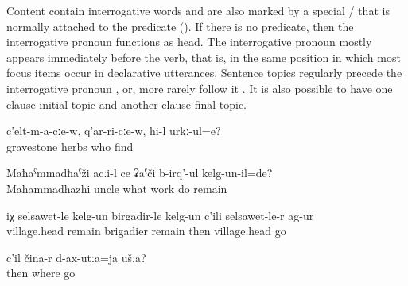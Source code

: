 Content  contain interrogative words and are also marked by a special  \slash{} that is normally attached to the predicate (). If there is no predicate, then the interrogative pronoun functions as head. The interrogative pronoun mostly appears immediately before the verb, that is, in the same position in which most focus items occur in declarative utterances. Sentence topics regularly precede the interrogative pronoun ,  or, more rarely follow it . It is also possible to have one clause-initial topic and another clause-final topic.
%
\begin{exe}
	\ex	\label{ex:Among the graves, in the grass, who finds (him)}
	\gll	c'elt-m-a-cːe-w,	q'ar-ri-cːe-w,	hi-l	urkː-ul=e?\\
		gravestone	herbs	who	find\\
	\glt	{}

	\ex	\label{ex:Which work was uncle Mahammadhazhi doing He was the village head, brigadier, then he stopped being village head}
	\begin{xlist}
		\ex	\label{ex:Which work was uncle Mahammadhazhi doing Q}
		\gll	Maħaˁmmadħaˁži	acːi-l		ce	ʡaˁči	b-irq'-ul		kelg-un-il=de?\\
			Mahammadhazhi	uncle	what	work	do	remain\\
		\glt	{}

		\ex	\label{ex:He was the village head, brigadier, then he stopped being village head A}
		\gll	iχ	selsawet-le	kelg-un	birgadir-le	kelg-un c'ili	selsawet-le-r	ag-ur\\
				village.head	remain	brigadier	remain	then	village.head	go\\
		\glt	{}
	\end{xlist}

	\ex	\label{ex:Then from where did you go We put up these (trousers) and go through the river}
	\begin{xlist}
		\ex	\label{ex:Then from where did you go Q}
		\gll	c'il	čina-r	d-ax-utːa=ja	ušːa?\\
			then	where	go \tsc{2pl}\\
		\glt	\sqt{‎Q: Then from where did you go?}


\end{xlist}
\end{exe}
